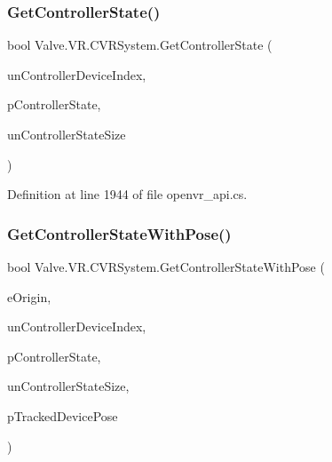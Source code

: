 \subsubsection{\texorpdfstring{GetControllerState()}{GetControllerState()}}
{\footnotesize\ttfamily bool Valve.\+V\+R.\+C\+V\+R\+System.\+Get\+Controller\+State (\begin{DoxyParamCaption}\item[{uint}]{un\+Controller\+Device\+Index,  }\item[{ref \mbox{\hyperlink{struct_valve_1_1_v_r_1_1_v_r_controller_state__t}{V\+R\+Controller\+State\+\_\+t}}}]{p\+Controller\+State,  }\item[{uint}]{un\+Controller\+State\+Size }\end{DoxyParamCaption})}



Definition at line 1944 of file openvr\+\_\+api.\+cs.

\mbox{\label{class_valve_1_1_v_r_1_1_c_v_r_system_af7c299caf58916815c437b40c6ce6e12}} 
\subsubsection{\texorpdfstring{GetControllerStateWithPose()}{GetControllerStateWithPose()}}
{\footnotesize\ttfamily bool Valve.\+V\+R.\+C\+V\+R\+System.\+Get\+Controller\+State\+With\+Pose (\begin{DoxyParamCaption}\item[{\mbox{\hyperlink{namespace_valve_1_1_v_r_a29be99a3c2f780157bd490db06a7f12f}{E\+Tracking\+Universe\+Origin}}}]{e\+Origin,  }\item[{uint}]{un\+Controller\+Device\+Index,  }\item[{ref \mbox{\hyperlink{struct_valve_1_1_v_r_1_1_v_r_controller_state__t}{V\+R\+Controller\+State\+\_\+t}}}]{p\+Controller\+State,  }\item[{uint}]{un\+Controller\+State\+Size,  }\item[{ref \mbox{\hyperlink{struct_valve_1_1_v_r_1_1_tracked_device_pose__t}{Tracked\+Device\+Pose\+\_\+t}}}]{p\+Tracked\+Device\+Pose }\end{DoxyParamCaption})}



